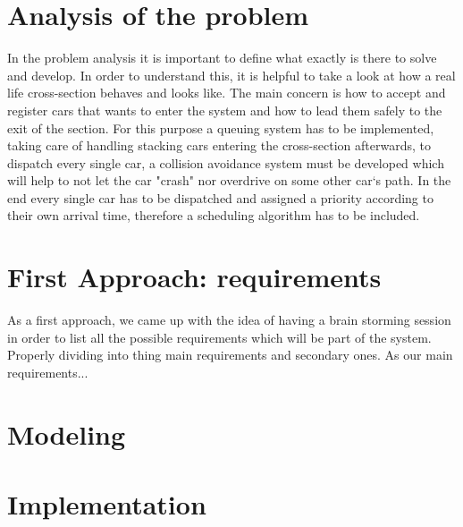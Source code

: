 \documentclass[conference]{IEEEtran}
\begin{document}
\section{Analysis of the problem}
In the problem analysis it is important to define what exactly is there to solve and develop. In order to understand this, it is helpful to take a look at how a real life cross-section behaves and looks like. The main concern is how to accept and register cars that wants to enter the system and how to lead them safely to the exit of the section. For this purpose a queuing system has to be implemented, taking care of handling stacking cars entering the cross-section afterwards, to dispatch every single car, a collision avoidance system must be developed which will help to not let the car "crash" nor overdrive on some other car`s path. In the end every single car has to be dispatched and assigned a priority according to their own arrival time, therefore a scheduling algorithm has to be included.

\section{First Approach: requirements}
As a first approach, we came up with the idea of having a brain storming session in order to list all the possible requirements which will be part of the system. Properly dividing into thing main requirements and secondary ones. As our main requirements...

\section{Modeling}

\section{Implementation}
\end{document}
